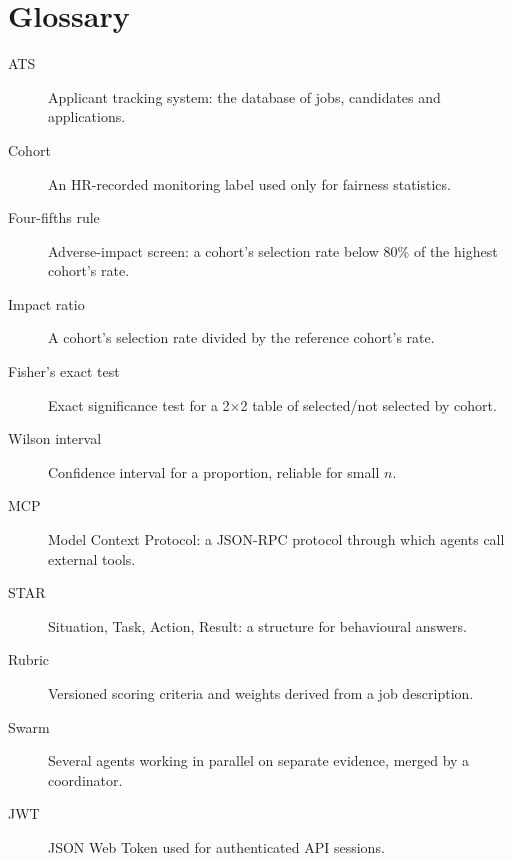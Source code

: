 \section {Glossary}
\begin{description}
\item[ATS] Applicant tracking system: the database of jobs, candidates and applications.
\item[Cohort] An HR-recorded monitoring label used only for fairness statistics.
\item[Four-fifths rule] Adverse-impact screen: a cohort's selection rate below 80\% of the highest cohort's rate.
\item[Impact ratio] A cohort's selection rate divided by the reference cohort's rate.
\item[Fisher's exact test] Exact significance test for a 2$\times$2 table of selected/not selected by cohort.
\item[Wilson interval] Confidence interval for a proportion, reliable for small $n$.
\item[MCP] Model Context Protocol: a JSON-RPC protocol through which agents call external tools.
\item[STAR] Situation, Task, Action, Result: a structure for behavioural answers.
\item[Rubric] Versioned scoring criteria and weights derived from a job description.
\item[Swarm] Several agents working in parallel on separate evidence, merged by a coordinator.
\item[JWT] JSON Web Token used for authenticated API sessions.
\end{description}

